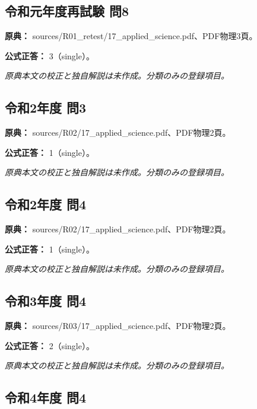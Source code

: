 \subsection{令和元年度再試験 問8}
\label{q:r01-ret-applied-08}

\noindent\textbf{原典：} sources/R01\_retest/17\_applied\_science.pdf、PDF物理3頁。

\textbf{公式正答：} 3（single）。

\par\textit{原典本文の校正と独自解説は未作成。分類のみの登録項目。}

\subsection{令和2年度 問3}
\label{q:r02-reg-applied-03}

\noindent\textbf{原典：} sources/R02/17\_applied\_science.pdf、PDF物理2頁。

\textbf{公式正答：} 1（single）。

\par\textit{原典本文の校正と独自解説は未作成。分類のみの登録項目。}

\subsection{令和2年度 問4}
\label{q:r02-reg-applied-04}

\noindent\textbf{原典：} sources/R02/17\_applied\_science.pdf、PDF物理2頁。

\textbf{公式正答：} 1（single）。

\par\textit{原典本文の校正と独自解説は未作成。分類のみの登録項目。}

\subsection{令和3年度 問4}
\label{q:r03-reg-applied-04}

\noindent\textbf{原典：} sources/R03/17\_applied\_science.pdf、PDF物理2頁。

\textbf{公式正答：} 2（single）。

\par\textit{原典本文の校正と独自解説は未作成。分類のみの登録項目。}

\subsection{令和4年度 問4}
\label{q:r04-reg-applied-04}

